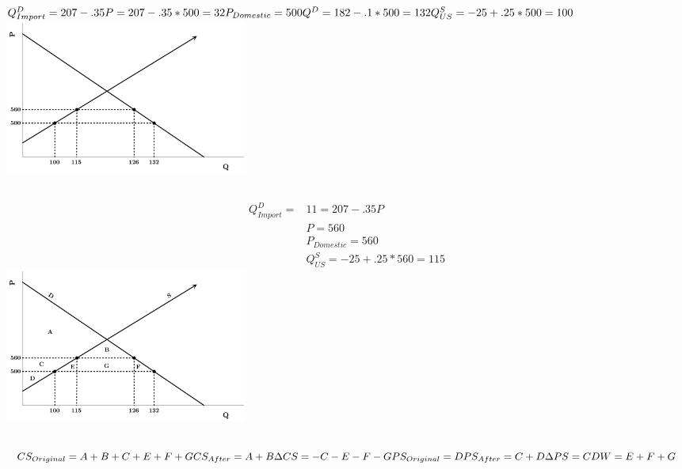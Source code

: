 \documentclass{article}
\begin{document}
	\subsection[b]{} 
$Q^D_{Import}=207-.35P=207-.35*500=32\\
P_{Domestic}=500\\
Q^D=182-.1*500=132\\
Q^S_{US}=-25+.25*500=100\\$
\includegraphics[height=2in]{Charts/6b}
	\subsection[c]{} 
	\subsection[d]{} 
\begin{align*}
Q^D_{Import}=&11=207-.35P\\
&P=560\\
&P_{Domestic}=560\\
&Q^S_{US}=-25+.25*560=115
\end{align*}
\includegraphics[height=2in]{Charts/6d}
	\subsection[e]{} 
$CS_{Original}=A+B+C+E+F+G\\
CS_{After}=A+B\\
\Delta CS=-C-E-F-G\\
PS_{Original}=D\\
PS_{After}=C+D\\
\Delta PS=C\\
DW=E+F+G\\$
\end{document}
